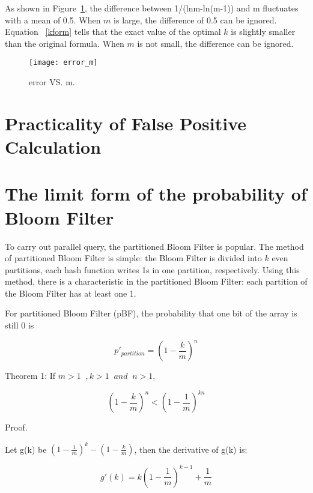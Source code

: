As shown in Figure~\ref{eva:err:m}, the difference between 1/(lnm-ln(m-1)) and m fluctuates with a mean of 0.5. When $m$ is large, the difference of 0.5 can be ignored. Equation ~\ref{kform} tells that the exact value of the optimal $k$ is slightly smaller than the original formula. When $m$ is not small, the difference can be ignored.

\begin{figure}
\centering
\texttt{[image: error\_m]}
\caption[FPtest]{error VS. m.}
\label{eva:err:m}
\end{figure} 


\section{Practicality of False Positive Calculation}

\section{The limit form of the probability of Bloom Filter}

To carry out parallel query, the partitioned Bloom Filter is popular. The method of partitioned Bloom Filter is simple: the Bloom Filter is divided into $k$ even partitions, each hash function writes 1s in one partition, respectively. Using this method, there is a characteristic in the partitioned Bloom Filter: each partition of the Bloom Filter has at least one 1.

For partitioned Bloom Filter (pBF), the probability that one bit of the array is still 0 is

\begin{equation}
p'_{partition} = \left( 1-\dfrac{k}{m} \right)  ^n
\end{equation}

Theorem 1: If $m > 1 \;\;,   k >1 \;\; and \;\; n > 1$,

\begin{equation}
\label{theorem1}
\left( 1-\dfrac{k}{m} \right)  ^n < 
\left( 1-\dfrac{1}{m} \right)  ^{kn}
\end{equation}

Proof. 

Let g(k) be $( 1-\frac{1}{m} )  ^k- ( 1-\frac{k}{m} )$, then the derivative of g(k) is:

\begin{equation}
g'(k)=k\left( 1- \dfrac{1}{m}\right) ^{k-1} +\dfrac{1}{m}
\end{equation}

